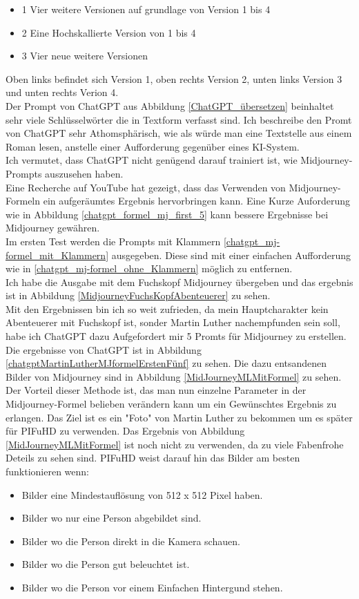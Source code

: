 \documentclass[10pt,a4paper,bibliography=totocnumbered,listof=totocnumbered]{scrartcl}
\begin{document}
\begin{itemize}
	\item 1 Vier weitere Versionen auf grundlage von Version 1 bis 4
	\item 2 Eine Hochskallierte Version von 1 bis 4
	\item 3 Vier neue weitere Versionen
\end{itemize}
Oben links befindet sich Version 1, oben rechts Version 2, unten links Version 3 und unten rechts Verion 4.
\\
Der Prompt von ChatGPT aus Abbildung \ref{ChatGPT_übersetzen} beinhaltet sehr viele Schlüsselwörter die in Textform verfasst sind. Ich beschreibe den Promt von ChatGPT sehr Athomsphärisch, wie als würde man eine Textstelle aus einem Roman lesen, anstelle einer Aufforderung gegenüber eines KI-System.
\\
Ich vermutet, dass ChatGPT nicht genügend darauf trainiert ist, wie Midjourney-Prompts auszusehen haben.
\\
Eine Recherche auf YouTube hat gezeigt, dass das Verwenden von Midjourney-Formeln ein aufgeräumtes Ergebnis hervorbringen kann. Eine Kurze Auforderung wie in Abbildung \ref{chatgpt_formel_mj_first_5} kann bessere Ergebnisse bei Midjourney gewähren.
\\
Im ersten Test werden die Prompts mit Klammern \ref{chatgpt_mj-formel_mit_Klammern} ausgegeben. Diese sind mit einer einfachen Aufforderung wie in \ref{chatgpt_mj-formel_ohne_Klammern} möglich zu entfernen.
\\
Ich habe die Ausgabe mit dem Fuchskopf Midjourney übergeben und das ergebnis ist in Abbildung \ref{MidjourneyFuchsKopfAbenteuerer} zu sehen.
\\
Mit den Ergebnissen bin ich so weit zufrieden, da mein Hauptcharakter kein Abenteuerer mit Fuchskopf ist, sonder Martin Luther nachempfunden sein soll, habe ich ChatGPT dazu Aufgefordert mir 5 Promts für Midjourney zu erstellen. Die ergebnisse von ChatGPT ist in Abbildung \ref{chatgptMartinLutherMJformelErstenFünf} zu sehen. Die dazu entsandenen Bilder von Midjourney sind in Abbildung \ref{MidJourneyMLMitFormel} zu sehen.
\\
Der Vorteil dieser Methode ist, das man nun einzelne Parameter in der Midjourney-Formel belieben verändern kann um ein Gewünschtes Ergebnis zu erlangen. Das Ziel ist es ein "Foto" von Martin Luther zu bekommen um es später für PIFuHD zu verwenden. Das Ergebnis von Abbildung \ref{MidJourneyMLMitFormel} ist noch nicht zu verwenden, da zu viele Fabenfrohe Deteils zu sehen sind. PIFuHD weist darauf hin das Bilder am besten funktionieren wenn:
\begin{itemize}
	\item Bilder eine Mindestauflösung von 512 x 512 Pixel haben.
	\item Bilder wo nur eine Person abgebildet sind.
	\item Bilder wo die Person direkt in die Kamera schauen.
	\item Bilder wo die Person gut beleuchtet ist.
	\item Bilder wo die Person vor einem Einfachen Hintergund stehen.
\end{itemize}
\end{document}

